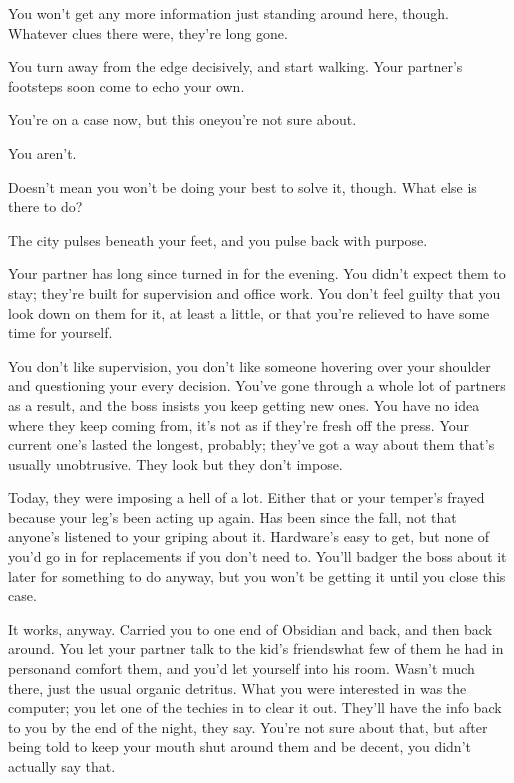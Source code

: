 You won't get any more information just standing around here, though. Whatever clues there were, they're long gone. 


You turn away from the edge decisively, and start walking. Your partner's footsteps soon come to echo your own.

You're on a case now, but this one\textemdash you're not sure about.

You aren't.

Doesn't mean you won't be doing your best to solve it, though. What else is there to do?

\hsep

The city pulses beneath your feet, and you pulse back with purpose.

Your partner has long since turned in for the evening. You didn't expect them to stay; they're built for supervision and office work. You don't feel guilty that you look down on them for it, at least a little, or that you're relieved to have some time for yourself. 

You don't like supervision, you don't like someone hovering over your shoulder and questioning your every decision. You've gone through a whole lot of partners as a result, and the boss insists you keep getting new ones. You have no idea where they keep coming from, it's not as if they're fresh off the press. Your current one's lasted the longest, probably; they've got a way about them that's usually unobtrusive. They look but they don't impose.

Today, they were imposing a hell of a lot. Either that or your temper's frayed because your leg's been acting up again. Has been since the fall, not that anyone's listened to your griping about it. Hardware's easy to get, but none of you'd go in for replacements if you don't need to. You'll badger the boss about it later for something to do anyway, but you won't be getting it until you close this case. 

It works, anyway. Carried you to one end of Obsidian and back, and then back around. You let your partner talk to the kid's friends\textemdash what few of them he had in person\textemdash and comfort them, and you'd let yourself into his room. Wasn't much there, just the usual organic detritus. What you were interested in was the computer; you let one of the techies in to clear it out.  They'll have the info back to you by the end of the night, they say. You're not sure about that, but after being told to keep your mouth shut around them and be decent, you didn't actually say that. 

